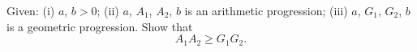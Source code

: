 Given: (i) $a$,  $b > 0$; (ii) $a$,  $A_1$,  $A_2$,  $b$ is an arithmetic progression; (iii) $a$,  $G_1$,  $G_2$,  $b$ is a geometric progression.  Show that\[A_1 A_2 \ge G_1 G_2.\]